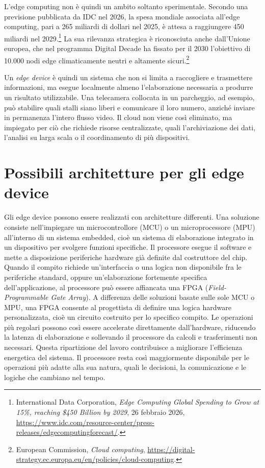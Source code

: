 \documentclass[a4paper,12pt]{article}
\begin{document}
L'edge computing non è quindi un ambito soltanto sperimentale. Secondo una previsione pubblicata da IDC nel 2026, la spesa mondiale associata all'edge computing, pari a 265 miliardi di dollari nel 2025, è attesa a raggiungere 450 miliardi nel 2029.\footnote{International Data Corporation, \emph{Edge Computing Global Spending to Grow at 15\%, reaching \$450 Billion by 2029}, 26 febbraio 2026, \url{https://www.idc.com/resource-center/press-releases/edgecomputingforecast/}.} La sua rilevanza strategica è riconosciuta anche dall'Unione europea, che nel programma Digital Decade ha fissato per il 2030 l'obiettivo di 10.000 nodi edge climaticamente neutri e altamente sicuri.\footnote{European Commission, \emph{Cloud computing}, \url{https://digital-strategy.ec.europa.eu/en/policies/cloud-computing}.}

Un \emph{edge device} è quindi un sistema che non si limita a raccogliere e trasmettere informazioni, ma esegue localmente almeno l'elaborazione necessaria a produrre un risultato utilizzabile. Una telecamera collocata in un parcheggio, ad esempio, può stabilire quali stalli siano liberi e comunicare il loro numero, anziché inviare in permanenza l'intero flusso video. Il cloud non viene così eliminato, ma impiegato per ciò che richiede risorse centralizzate, quali l'archiviazione dei dati, l'analisi su larga scala o il coordinamento di più dispositivi.

\section{Possibili architetture per gli edge device}

Gli edge device possono essere realizzati con architetture differenti. Una soluzione consiste nell'impiegare un microcontrollore (MCU) o un microprocessore (MPU) all'interno di un sistema embedded, cioè un sistema di elaborazione integrato in un dispositivo per svolgere funzioni specifiche. Il processore esegue il software e mette a disposizione periferiche hardware già definite dal costruttore del chip. Quando il compito richiede un'interfaccia o una logica non disponibile fra le periferiche standard, oppure un'elaborazione fortemente specifica dell'applicazione, al processore può essere affiancata una FPGA (\emph{Field-Programmable Gate Array}). A differenza delle soluzioni basate sulle sole MCU o MPU, una FPGA consente al progettista di definire una logica hardware personalizzata, cioè un circuito costruito per lo specifico compito. Le operazioni più regolari possono così essere accelerate direttamente dall'hardware, riducendo la latenza di elaborazione e sollevando il processore da calcoli e trasferimenti non necessari. Questa ripartizione del lavoro contribuisce a migliorare l'efficienza energetica del sistema. Il processore resta così maggiormente disponibile per le operazioni più adatte alla sua natura, quali le decisioni, la comunicazione e le logiche che cambiano nel tempo.
\end{document}
